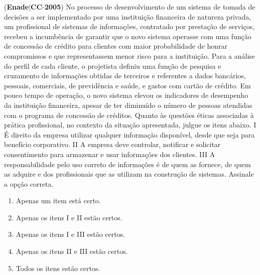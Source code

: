 \documentclass{exam}
\begin{document}
\begin{questions}
\begin{enumerate}[label=\alph*)]
	\end{enumerate}

\question (\textbf{Enade}$|$\textbf{CC}-\textbf{2005}) No processo de desenvolvimento de um sistema de
tomada de decisões a ser implementado por uma
instituição financeira de natureza privada, um profissional
de sistemas de informações, contratado por prestação de
serviços, recebeu a incumbência de garantir que o novo
sistema operasse com uma função de concessão de crédito
para clientes com maior probabilidade de honrar
compromissos e que representassem menor risco para a
instituição. Para a análise do perfil de cada cliente, o
projetista definiu uma função de pesquisa e cruzamento
de informações obtidas de terceiros e referentes a dados
bancários, pessoais, comerciais, de previdência e saúde, e
gastos com cartão de crédito. Em pouco tempo de
operação, o novo sistema elevou os indicadores de
desempenho da instituição financeira, apesar de ter
diminuído o número de pessoas atendidas com o
programa de concessão de créditos.
Quanto às questões éticas associadas à prática profissional, no
contexto da situação apresentada, julgue os itens abaixo.
I É direito da empresa utilizar qualquer informação
disponível, desde que seja para benefício corporativo.
II A empresa deve controlar, notificar e solicitar
consentimento para armazenar e usar informações dos
clientes.
III A responsabilidade pelo uso correto de informações é de
quem as fornece, de quem as adquire e dos profissionais que
as utilizam na construção de sistemas.
Assinale a opção correta.
	\begin{enumerate}[label=\alph*)]
		\item  Apenas um item está certo.
		\item  Apenas os itens I e II estão certos.
		\item  Apenas os itens I e III estão certos.
		\item  Apenas os itens II e III estão certos.
		\item  Todos os itens estão certos.

	\end{enumerate}


\end{questions}
\end{document}
